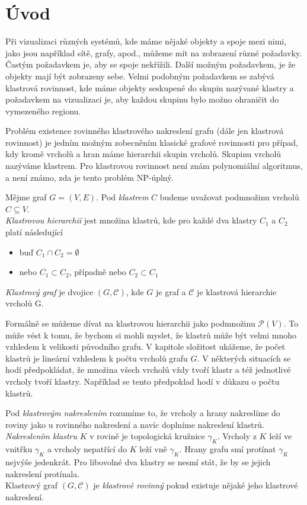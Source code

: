 \chapter{Úvod}

Při vizualizaci různých systémů, kde máme nějaké objekty a spoje mezi nimi, jako jsou například sítě, grafy, apod., můžeme mít na zobrazení různé požadavky. Častým požadavkem je, aby se spoje nekřížili. Další možným požadavkem, je že objekty mají být zobrazeny  sebe. Velmi podobným požadavkem se zabývá klastrová rovinnost, kde máme objekty seskupené do skupin nazývané klastry a požadavkem na vizualizaci je, aby každou skupinu bylo možno ohraničit do vymezeného regionu.

Problém existence rovinného klastrového nakreslení grafu (dále jen klastrová rovinnost) je jedním možným zobecněním klasické grafové rovinnosti pro případ, kdy kromě vrcholů a hran máme hierarchii skupin vrcholů. Skupinu vrcholů nazýváme klastrem. Pro klastrovou rovinnost není znám polynomiální algoritmus, a není známo, zda je tento problém NP-úplný. 

\begin{defn}
Mějme graf $G=(V,E)$. Pod \textit{klastrem} $C$ budeme uvažovat podmnožinu vrcholů  $C \subseteq V$. \\
\textit{Klastrovou hierarchií} jest množina klastrů, kde pro každé dva klastry $C_1$ a $C_2$ platí následující
\begin{itemize}
\item buď $C_1 \cap C_2 = \emptyset$
\item nebo $C_1 \subset C_2$, případně nebo $C_2 \subset C_1$
\end{itemize}
\textit{Klastrový graf} je dvojice $(G,\mathcal C)$, kde $G$ je graf a $\mathcal C$ je klastrová hierarchie vrcholů G.
\end{defn}

Formálně se můžeme dívat na klastrovou hierarchii jako podmnožinu $\mathcal P (V)$. To může vést k tomu, že bychom si mohli myslet, že klastrů může být velmi mnoho vzhledem k velikosti původního grafu. V kapitole složitost ukážeme, že počet klastrů je lineární vzhledem k počtu vrcholů grafu $G$. V některých situacích se hodí předpokládat, že množina všech vrcholů vždy tvoří klastr a též jednotlivé vrcholy tvoří klastry. Například se tento předpoklad  hodí v důkazu o počtu klastrů.

\begin{defn}
Pod \textit{klastrovým nakreslením} rozumíme to, že vrcholy a hrany nakreslíme do roviny jako u rovinného nakreslení a navíc doplníme nakreslení klastrů.\\ 
\textit{Nakreslením klastru} $K$ v rovině je topologická kružnice $\gamma_K$. Vrcholy z $K$ leží ve vnitřku $\gamma_K$ a vrcholy nepatřící do $K$ leží vně $\gamma_K$. Hrany grafu smí protínat $\gamma_K$ nejvýše jedenkrát. Pro libovolné dva klastry se nesmí stát, že by se jejich nakreslení protínala.\\
Klastrový graf $(G,\mathcal C)$ je \textit{klastrově rovinný} pokud existuje nějaké jeho klastrové nakreslení.
\end{defn}

